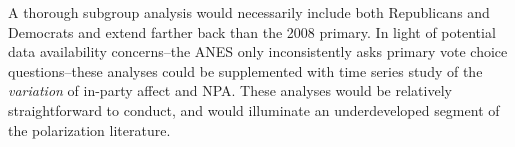 \documentclass[12pt]{article}
\begin{document}
A thorough subgroup analysis would necessarily include both Republicans and Democrats and extend farther back than the 2008 primary. In light of potential data availability concerns--the ANES only inconsistently asks primary vote choice questions--these analyses could be supplemented with time series study of the \textit{variation} of in-party affect and NPA. These analyses would be relatively straightforward to conduct, and would illuminate an underdeveloped segment of the polarization literature.







\thispagestyle{empty}
\clearpage
{}

\end{document}
